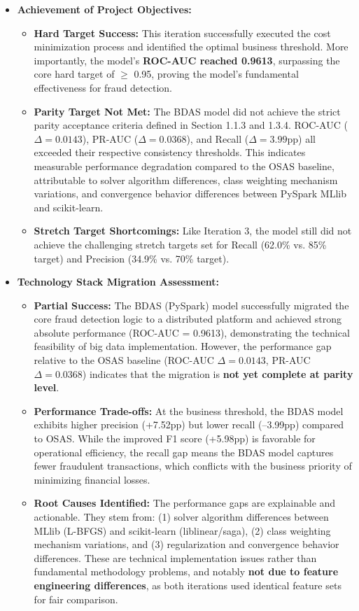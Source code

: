 \documentclass[sigplan,screen]{acmart}
\begin{document}
\begin{itemize}
\item \textbf{Achievement of Project Objectives:}
\begin{itemize}
\item \textbf{Hard Target Success:} This iteration successfully executed the cost minimization process and identified the optimal business threshold. More importantly, the model's \textbf{ROC-AUC reached 0.9613}, surpassing the core hard target of $\geq$ 0.95, proving the model's fundamental effectiveness for fraud detection.
\item \textbf{Parity Target Not Met:} The BDAS model did not achieve the strict parity acceptance criteria defined in Section 1.1.3 and 1.3.4. ROC-AUC ($\Delta=0.0143$), PR-AUC ($\Delta=0.0368$), and Recall ($\Delta=3.99$pp) all exceeded their respective consistency thresholds. This indicates measurable performance degradation compared to the OSAS baseline, attributable to solver algorithm differences, class weighting mechanism variations, and convergence behavior differences between PySpark MLlib and scikit-learn.
\item \textbf{Stretch Target Shortcomings:} Like Iteration 3, the model still did not achieve the challenging stretch targets set for Recall (62.0\% vs. 85\% target) and Precision (34.9\% vs. 70\% target).
\end{itemize}

\item \textbf{Technology Stack Migration Assessment:}
\begin{itemize}
\item \textbf{Partial Success:} The BDAS (PySpark) model successfully migrated the core fraud detection logic to a distributed platform and achieved strong absolute performance (ROC-AUC = 0.9613), demonstrating the technical feasibility of big data implementation. However, the performance gap relative to the OSAS baseline (ROC-AUC $\Delta=0.0143$, PR-AUC $\Delta=0.0368$) indicates that the migration is \textbf{not yet complete at parity level}.
\item \textbf{Performance Trade-offs:} At the business threshold, the BDAS model exhibits higher precision (+7.52pp) but lower recall (--3.99pp) compared to OSAS. While the improved F1 score (+5.98pp) is favorable for operational efficiency, the recall gap means the BDAS model captures fewer fraudulent transactions, which conflicts with the business priority of minimizing financial losses.
\item \textbf{Root Causes Identified:} The performance gaps are explainable and actionable. They stem from: (1) solver algorithm differences between MLlib (L-BFGS) and scikit-learn (liblinear/saga), (2) class weighting mechanism variations, and (3) regularization and convergence behavior differences. These are technical implementation issues rather than fundamental methodology problems, and notably \textbf{not due to feature engineering differences}, as both iterations used identical feature sets for fair comparison.
\end{itemize}
\end{itemize}
\end{document}

